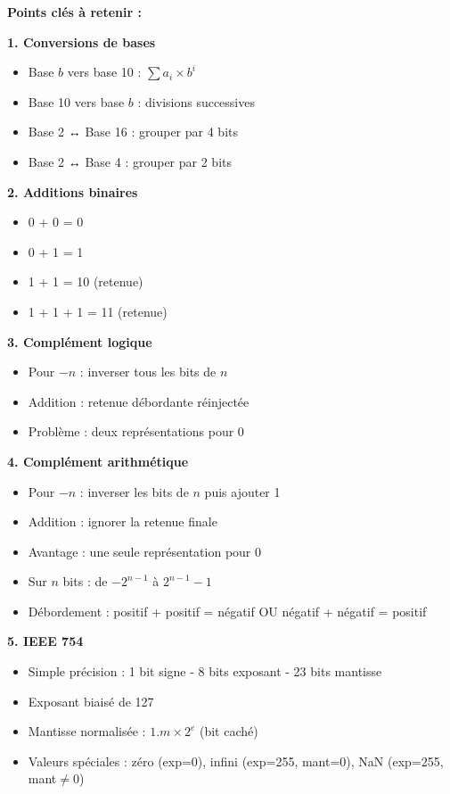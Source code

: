 \documentclass[12pt,a4paper]{article}
\begin{document}
\begin{remarque}
\textbf{Points clés à retenir :}

\textbf{1. Conversions de bases}
\begin{itemize}
    \item Base $b$ vers base 10 : $\sum a_i \times b^i$
    \item Base 10 vers base $b$ : divisions successives
    \item Base 2 ↔ Base 16 : grouper par 4 bits
    \item Base 2 ↔ Base 4 : grouper par 2 bits
\end{itemize}

\textbf{2. Additions binaires}
\begin{itemize}
    \item 0 + 0 = 0
    \item 0 + 1 = 1
    \item 1 + 1 = 10 (retenue)
    \item 1 + 1 + 1 = 11 (retenue)
\end{itemize}

\textbf{3. Complément logique}
\begin{itemize}
    \item Pour $-n$ : inverser tous les bits de $n$
    \item Addition : retenue débordante réinjectée
    \item Problème : deux représentations pour 0
\end{itemize}

\textbf{4. Complément arithmétique}
\begin{itemize}
    \item Pour $-n$ : inverser les bits de $n$ puis ajouter 1
    \item Addition : ignorer la retenue finale
    \item Avantage : une seule représentation pour 0
    \item Sur $n$ bits : de $-2^{n-1}$ à $2^{n-1}-1$
    \item Débordement : positif + positif = négatif OU négatif + négatif = positif
\end{itemize}

\textbf{5. IEEE 754}
\begin{itemize}
    \item Simple précision : 1 bit signe - 8 bits exposant - 23 bits mantisse
    \item Exposant biaisé de 127
    \item Mantisse normalisée : $1.m \times 2^e$ (bit caché)
    \item Valeurs spéciales : zéro (exp=0), infini (exp=255, mant=0), NaN (exp=255, mant$\neq$0)
\end{itemize}


\end{remarque}
\end{document}
